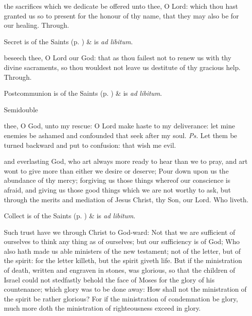 
\secret
{} the sacrifices which we dedicate be offered unto thee, O Lord: which thou hast granted us so to present for the honour of thy name, that they may also be for our healing. Through.
\begin{rubric}
     Secret is of the Saints (p. \pageref{SPSaints}) \&  is \emph{ad libitum}.
\end{rubric}


\postcommunion
{} beseech thee, O Lord our God: that as thou failest not to renew us with thy divine sacraments, so thou wouldest not leave us destitute of thy gracious help. Through.
\begin{rubric}
     Postcommunion is of the Saints (p. \pageref{SPSaints}) \&  is \emph{ad libitum}.
\end{rubric}

\begin{inhead}
{Semidouble}
\end{inhead}

\properantiphonfix

\introit
{} thee, O God, unto my rescue: O Lord make haste to my deliverance: let mine enemies be ashamed and confounded that seek after my soul. \textit{Ps.} Let them be turned backward and put to confusion: that wish me evil.

\collect
{} and everlasting God, who art always more ready to hear than we to pray, and art wont to give more than either we desire or deserve; Pour down upon us the abundance of thy mercy; forgiving us those things whereof our conscience is afraid, and giving us those good things which we are not worthy to ask, but through the merits and mediation of Jesus Christ, thy Son, our Lord. Who liveth.
\begin{rubric}
     Collect is of the Saints (p. \pageref{SPSaints}) \&  is \emph{ad libitum}.
\end{rubric}

 Such trust have we through Christ to God-ward: Not that we are sufficient of ourselves to think any thing as of ourselves; but our sufficiency is of God; Who also hath made us able ministers of the new testament; not of the letter, but of the spirit: for the letter killeth, but the spirit giveth life. But if the ministration of death, written and engraven in stones, was glorious, so that the children of Israel could not stedfastly behold the face of Moses for the glory of his countenance; which glory was to be done away: How shall not the ministration of the spirit be rather glorious? For if the ministration of condemnation be glory, much more doth the ministration of righteousness exceed in glory.

